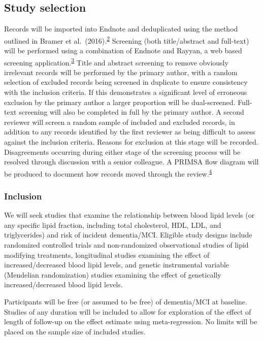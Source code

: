 \documentclass[a4paper, nobind]{templates/ociamthesis}
\begin{document}
\hypertarget{study-selection}{%
\subsection{Study selection}\label{study-selection}}

Records will be imported into Endnote and deduplicated using the method outlined in Bramer et al.~(2016).\textsuperscript{\protect\hyperlink{ref-bramer2016}{2}} Screening (both title/abstract and full-text) will be performed using a combination of Endnote and Rayyan, a web based screening application.\textsuperscript{\protect\hyperlink{ref-ouzzani2016}{3}}
Title and abstract screening to remove obviously irrelevant records will be performed by the primary author, with a random selection of excluded records being screened in duplicate to ensure consistency with the inclusion criteria. If this demonstrates a significant level of erroneous exclusion by the primary author a larger proportion will be dual-screened.
Full-text screening will also be completed in full by the primary author. A second reviewer will screen a random sample of included and excluded records, in addition to any records identified by the first reviewer as being difficult to assess against the inclusion criteria. Reasons for exclusion at this stage will be recorded. Disagreements occurring during either stage of the screening process will be resolved through discussion with a senior colleague. A PRIMSA flow diagram will be produced to document how records moved through the review.\textsuperscript{\protect\hyperlink{ref-zotero-766}{4}}

\hypertarget{inclusion}{%
\subsubsection{Inclusion}\label{inclusion}}

We will seek studies that examine the relationship between blood lipid levels (or any specific lipid fraction, including total cholesterol, HDL, LDL, and triglycerides) and risk of incident dementia/MCI. Eligible study designs include randomized controlled trials and non-randomized observational studies of lipid modifying treatments, longitudinal studies examining the effect of increased/decreased blood lipid levels, and genetic instrumental variable (Mendelian randomization) studies examining the effect of genetically increased/decreased blood lipid levels.

Participants will be free (or assumed to be free) of dementia/MCI at baseline. Studies of any duration will be included to allow for exploration of the effect of length of follow-up on the effect estimate using meta-regression. No limits will be placed on the sample size of included studies.
\end{document}
